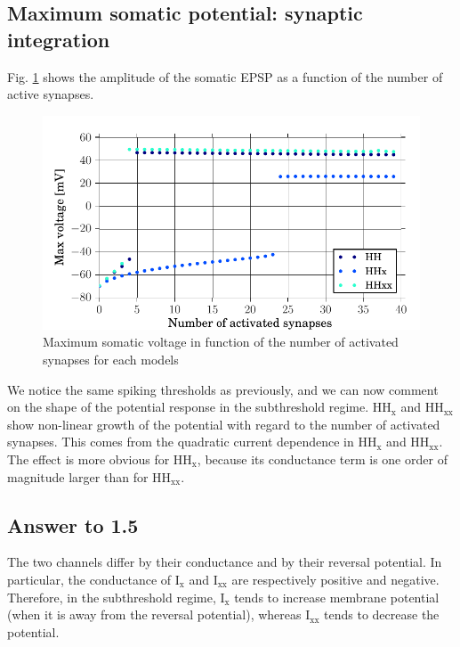 \documentclass[a4paper, 10pt, conference]{ieeeconf}      %
\begin{document}
\subsection{Maximum somatic potential: synaptic integration}
Fig. \ref{fig:1_4} shows the amplitude of the somatic EPSP as a function of the number of active synapses. 

\begin{figure}
\includegraphics[width=\columnwidth]{../figures/1_4-number_of_synapses.pdf}

\caption{Maximum somatic voltage in function of the number of activated synapses for each models}
\label{fig:1_4}
\end{figure}


We notice the same spiking thresholds as previously, and we can now comment on the shape of the potential response in the subthreshold regime. HH$_\text{x}$ and HH$_\text{xx}$ show non-linear growth of the potential with regard to the number of activated synapses. This comes from the quadratic current dependence in HH$_\text{x}$ and HH$_\text{xx}$. The effect is more obvious for HH$_\text{x}$, because its conductance term is one order of magnitude larger than for HH$_\text{xx}$. 





\subsection{Answer to 1.5}
The two channels differ by their conductance and by their reversal potential. In particular, the conductance of I$_\text{x}$ and I$_\text{xx}$ are respectively positive and negative. Therefore, in the subthreshold regime, I$_\text{x}$ tends to increase membrane potential (when it is away from the reversal potential), whereas I$_\text{xx}$ tends to decrease the potential. 
\end{document}

